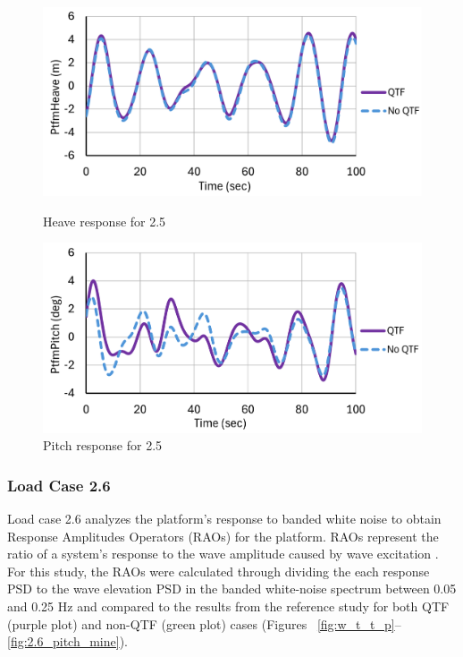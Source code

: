 \documentclass[a4paper, 11pt]{article}
\begin{document}
\begin{figure}[H]
    \begin{minipage}{0.49\textwidth}
        \centering
        \includegraphics[width=1\textwidth]{2.5_heave.png}
        \caption{\small Heave response for 2.5}
        \label{fig:2.5_heave}
    \end{minipage}
    \hfill
    \begin{minipage}{0.49\textwidth}
        \centering
        \vspace{-0.3cm}
        \includegraphics[width=1\textwidth]{2.5_pitch.png}
        \caption{\small Pitch response for 2.5}
        \label{fig:2.5_pitch}
    \end{minipage}
\end{figure}

\subsubsection{Load Case 2.6}
\hspace*{0.5cm}Load case 2.6 analyzes the platform's response to banded white noise to obtain Response Amplitudes Operators (RAOs) for the platform. RAOs represent the ratio of a system's response to the wave amplitude caused by wave excitation \cite{RAO}. For this study, the RAOs were calculated through dividing the each response PSD to the wave elevation PSD in the banded white-noise spectrum between 0.05 and 0.25 Hz and compared to the results from the reference study for both QTF (purple plot) and non-QTF (green plot) cases (Figures ~\ref{fig:w_t_t_p}--\ref{fig:2.6_pitch_mine}).
\end{document}

